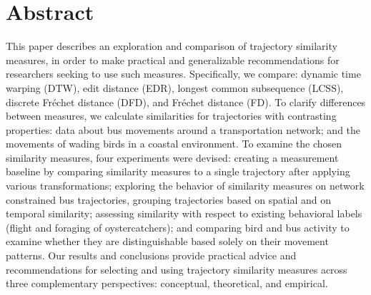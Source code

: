 \documentclass[10pt,letterpaper]{article}
\begin{document}
\section*{Abstract}

This paper describes an exploration and comparison of trajectory similarity measures, in order to make practical and generalizable recommendations for researchers seeking to use such measures. Specifically, we compare: dynamic time warping (DTW), edit distance (EDR), longest common subsequence (LCSS), discrete Fréchet distance (DFD), and Fréchet distance (FD). To clarify differences between measures, we calculate similarities for trajectories with contrasting properties: data about bus movements around a transportation network; and the movements of wading birds in a coastal environment. To examine the chosen similarity measures, four experiments were devised: creating a measurement baseline by comparing similarity measures to a single trajectory after applying various transformations; exploring the behavior of similarity measures on network constrained bus trajectories, grouping trajectories based on spatial and on temporal similarity; assessing similarity with respect to existing behavioral labels (flight and foraging of oystercatchers); and comparing bird and bus activity to examine whether they are distinguishable based solely on their movement patterns. Our results and conclusions provide practical advice and recommendations for selecting and using trajectory similarity measures across three complementary perspectives: conceptual, theoretical, and empirical. 

\end{document}
